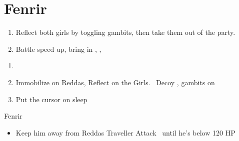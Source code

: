 \chapter{Fenrir}

\begin{enumerate}
\item Reflect both girls by toggling gambits, then take them out of the party.
\item Battle speed up, bring in \balthier, \ashe, \penelo
\end{enumerate}

\begin{gambit}
\begin{itemize}
\end{itemize}
\end{gambit}
\begin{enumerate}
\item \leader{\balthier}
\item Immobilize on Reddas, Reflect on the Girls. \ashe\ Decoy \balthier, gambits on
\item Put the cursor on sleep
\end{enumerate}
\begin{battle}{Fenrir}
\begin{itemize}
\balthierf Run backwards diagonal, spam Sleep
\item Keep him away from Reddas
\balthierf Traveller
\balthierf Attack \balthier\ until he's below 120 HP
\end{itemize}
\end{battle}